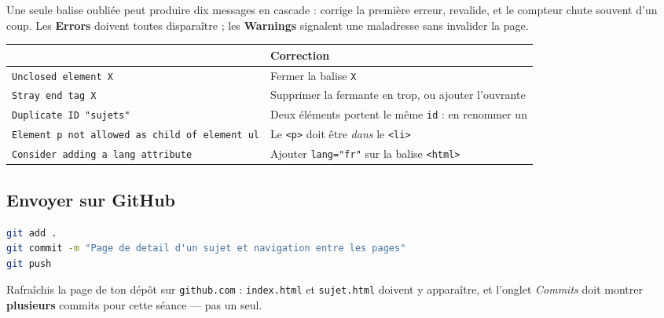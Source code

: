 \documentclass[a4paper,11pt]{article}
\newcommand{\hdr}[1]{\multicolumn{1}{l}{\color{white}\bfseries #1}}
\renewcommand{\arraystretch}{1.3}
\begin{document}
\begin{tcolorbox}[astuce, title={Rappel de méthode}]
Une seule balise oubliée peut produire dix messages en cascade : corrige la première erreur, revalide, et le compteur chute souvent d'un coup. Les \textbf{Errors} doivent toutes disparaître ; les \textbf{Warnings} signalent une maladresse sans invalider la page.
\end{tcolorbox}

\begin{center}
\renewcommand{\arraystretch}{1.0}
\begin{tabularx}{\linewidth}{p{5.4cm}X}
  \toprule
  \rowcolor{uniNavy}
  \hdr{Message} & \hdr{Correction} \\
  \midrule
  \rowcolor{uniPaper}
  \texttt{Unclosed element X} & Fermer la balise \texttt{X} \\
  \texttt{Stray end tag X} & Supprimer la fermante en trop, ou ajouter l'ouvrante \\
  \rowcolor{uniPaper}
  \texttt{Duplicate ID "sujets"} & Deux éléments portent le même \texttt{id} : en renommer un \\
  \texttt{Element p not allowed as child of element ul} & Le \texttt{<p>} doit être \textit{dans} le \texttt{<li>} \\
  \rowcolor{uniPaper}
  \texttt{Consider adding a lang attribute} & Ajouter \texttt{lang="fr"} sur la balise \texttt{<html>} \\
  \bottomrule
\end{tabularx}
\end{center}

\subsection{Envoyer sur GitHub}

\begin{lstlisting}[language=bash, numbers=none]
git add .
git commit -m "Page de detail d'un sujet et navigation entre les pages"
git push
\end{lstlisting}

\begin{tcolorbox}[astuce, title={Vérifier que c'est bien parti}]
Rafraîchis la page de ton dépôt sur \texttt{github.com} : \texttt{index.html} et \texttt{sujet.html} doivent y apparaître, et l'onglet \textit{Commits} doit montrer \textbf{plusieurs} commits pour cette séance --- pas un seul.
\end{tcolorbox}

\end{document}
